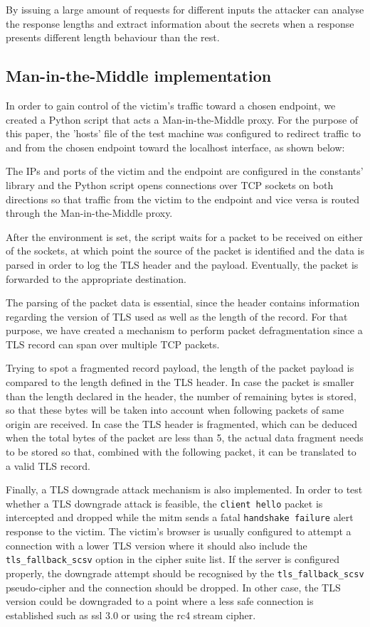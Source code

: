By issuing a large amount of requests for different inputs the attacker can
analyse the response lengths and extract information about the secrets when a
response presents different length behaviour than the rest.

\subsection{Man-in-the-Middle implementation}

In order to gain control of the victim's traffic toward a chosen endpoint, we
created a Python script that acts a Man-in-the-Middle proxy. For the purpose of
this paper, the 'hosts' file of the test machine was configured to redirect
traffic to and from the chosen endpoint toward the localhost interface, as shown
below:


The IPs and ports of the victim and the endpoint are configured in the
constants' library and the Python script opens connections over TCP sockets on
both directions so that traffic from the victim to the endpoint and vice versa
is routed through the Man-in-the-Middle proxy.

After the environment is set, the script waits for a packet to be received on
either of the sockets, at which point the source of the packet is identified and
the data is parsed in order to log the TLS header and the payload. Eventually,
the packet is forwarded to the appropriate destination.

The parsing of the packet data is essential, since the header contains
information regarding the version of TLS used as well as the length of the
record. For that purpose, we have created a mechanism to perform packet
defragmentation since a TLS record can span over multiple TCP packets.

Trying to spot a fragmented record payload, the length of the packet payload is
compared to the length defined in the TLS header. In case the packet is smaller
than the length declared in the header, the number of remaining bytes is stored,
so that these bytes will be taken into account when following packets of same
origin are received. In case the TLS header is fragmented, which can be deduced
when the total bytes of the packet are less than 5, the actual data fragment
needs to be stored so that, combined with the following packet, it can be
translated to a valid TLS record.

Finally, a TLS downgrade attack mechanism is also implemented. In order to test
whether a TLS downgrade attack is feasible, the \texttt{client hello} packet is
intercepted and dropped while the mitm sends a fatal \texttt{handshake failure}
alert response to the victim. The victim's browser is usually configured to
attempt a connection with a lower TLS version where it should also include the
\texttt{tls\_fallback\_scsv} option in the cipher suite list. If the server is
configured properly, the downgrade attempt should be recognised by the
\texttt{tls\_fallback\_scsv} pseudo-cipher and the connection should be dropped.
In other case, the TLS version could be downgraded to a point where a less safe
connection is established such as ssl 3.0 or using the rc4 stream cipher.

